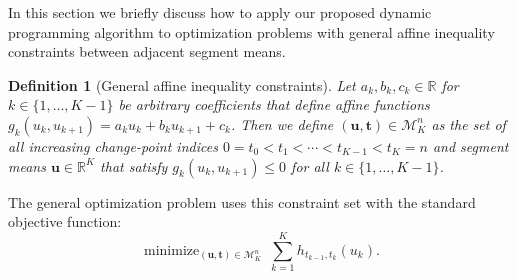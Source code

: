 \documentclass{article}
\newtheorem{definition}{Definition}
\DeclareMathOperator*{\minimize}{minimize}
\newcommand{\RR}{\mathbb R}
\begin{document}





In this section we briefly discuss how to apply our proposed dynamic
programming algorithm to optimization problems with general affine
inequality constraints between adjacent segment means.

\begin{definition}[General affine inequality constraints]
\label{def:affine-inequality-constraints}
  Let $a_k,b_k,c_k\in\RR$ for $k\in\{1,\dots,K-1\}$ be arbitrary
  coefficients that define affine functions
  $g_k(u_k, u_{k+1})=a_k u_k + b_k u_{k+1} + c_k$. Then we define
  $(\mathbf u, \mathbf t)\in\mathcal M^n_K$ as the set of all
  increasing change-point indices $0=t_0<t_1<\cdots<t_{K-1}<t_K=n$ and
  segment means $\mathbf u\in\RR^K$ that satisfy
  $g_k(u_k, u_{k+1}) \leq 0$ for all $k\in\{1,\dots, K-1\}$.
\end{definition}
The general optimization problem uses this constraint set with the
standard objective function:
\begin{equation}
  \label{eq:min_general_affine_inequality}
    \minimize_{
        (\mathbf u, \mathbf t)\in\mathcal M^n_K
      } \ 
\sum_{k=1}^K h_{t_{k-1}, t_k}(u_k).
\end{equation}
\end{document}
